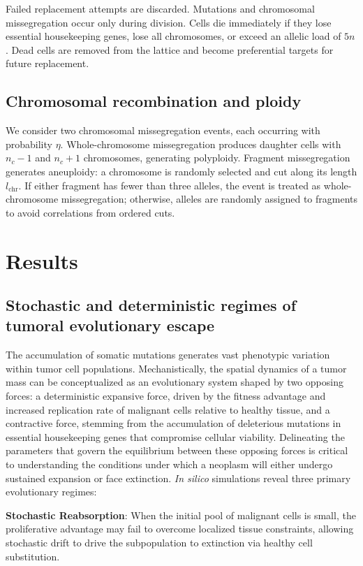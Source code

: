 \documentclass[10pt, aps, rmp,  twocolumn, superscriptaddress, floatfix, showkeys]{revtex4-2}
\begin{document}
Failed replacement attempts are discarded. Mutations and chromosomal missegregation occur only during division. Cells die immediately if they lose essential housekeeping genes, lose all chromosomes, or exceed an allelic load of $5n$. Dead cells are removed from the lattice and become preferential targets for future replacement.


\subsection*{Chromosomal recombination and ploidy}

We consider two chromosomal missegregation events, each occurring with probability $\eta$. Whole-chromosome missegregation produces daughter cells with $n_c-1$ and $n_c+1$ chromosomes, generating polyploidy. Fragment missegregation generates aneuploidy: a chromosome is randomly selected and cut along its length $l_{\text{chr}}$. If either fragment has fewer than three alleles, the event is treated as whole-chromosome missegregation; otherwise, alleles are randomly assigned to fragments to avoid correlations from ordered cuts.


\section*{Results}

\subsection*{Stochastic and deterministic regimes of tumoral evolutionary escape}

The accumulation of somatic mutations generates vast phenotypic variation within tumor cell populations. Mechanistically, the spatial dynamics of a tumor mass can be conceptualized as an evolutionary system shaped by two opposing forces: a deterministic expansive force, driven by the fitness advantage and increased replication rate of malignant cells relative to healthy tissue, and a contractive force, stemming from the accumulation of deleterious mutations in essential housekeeping genes that compromise cellular viability. Delineating the parameters that govern the equilibrium between these opposing forces is critical to understanding the conditions under which a neoplasm will either undergo sustained expansion or face extinction.  \textit{In silico} simulations reveal three primary evolutionary regimes:

{\bf Stochastic Reabsorption}: When the initial pool of malignant cells is small, the proliferative advantage may fail to overcome localized tissue constraints, allowing stochastic drift to drive the subpopulation to extinction via healthy cell substitution.  
\end{document}
